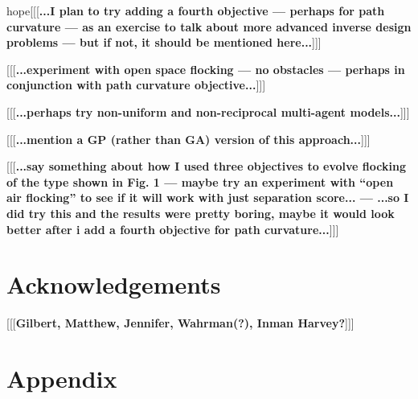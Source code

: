 \documentclass[letterpaper]{article}
\begin{document}
hope[[[\textbf{...I plan to try adding a fourth objective --- perhaps for path curvature --- as an exercise to talk about more advanced inverse design problems --- but if not, it should be mentioned here...}]]]

[[[\textbf{...experiment with open space flocking --- no obstacles --- perhaps in conjunction with path curvature objective...}]]]

[[[\textbf{...perhaps try non-uniform \citep{montanari_optimal_2025} and non-reciprocal \citep{choi_flocking_2025} multi-agent models...}]]]

[[[\textbf{...mention a GP (rather than GA) version of this approach...}]]]

[[[\textbf{...say something about how I used three objectives to evolve flocking of the type shown in Fig. 1 --- maybe try an experiment with ``open air flocking'' to see if it will work with just separation score... --- ...so I did try this and the results were pretty boring, maybe it would look better after i add a fourth objective for path curvature...}]]]

\section{Acknowledgements}
\label{sec:ack}

[[[\textbf{Gilbert, Matthew, Jennifer, Wahrman(?), Inman Harvey?}]]]









\appendix
\onecolumn
\section{Appendix}
\label{sec:appendix}
\end{document}
